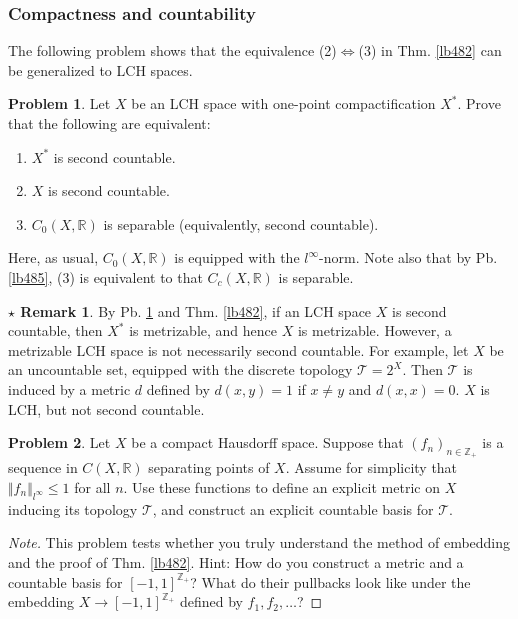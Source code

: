 \documentclass[12pt,b5paper,notitlepage]{article}
\theoremstyle{definition}
\newtheorem{srem}[df]{$\star$ Remark}
\newtheorem{prob}{\color{red}Problem}[section]
\theoremstyle{plain}
\newcommand{\mc}{\mathcal}
\newcommand{\Zbb}{\mathbb Z}
\newcommand{\Rbb}{\mathbb R}
\numberwithin{equation}{section}
\begin{document}
\subsubsection{Compactness and countability}


The following problem shows that the equivalence (2)$\Leftrightarrow$(3) in Thm. \ref{lb482} can be generalized to LCH spaces.

\begin{prob}\label{lb484}
Let $X$ be an LCH space with one-point compactification $X^*$. Prove that the following are equivalent:
\begin{enumerate}[label=(\arabic*)]
\item $X^*$ is second countable.
\item $X$ is second countable.
\item $C_0(X,\Rbb)$ is separable (equivalently, second countable).
\end{enumerate}
Here, as usual, $C_0(X,\Rbb)$ is equipped with the $l^\infty$-norm. Note also that by Pb. \ref{lb485}, (3) is equivalent to that $C_c(X,\Rbb)$ is separable.
\end{prob}


\begin{srem}
By Pb. \ref{lb484} and Thm. \ref{lb482}, if an LCH space $X$ is second countable, then $X^*$ is metrizable, and hence $X$ is metrizable. However, a metrizable LCH space is not necessarily second countable. For example, let $X$ be an uncountable set, equipped with the discrete topology $\mc T=2^X$. Then $\mc T$ is induced by a metric $d$ defined by $d(x,y)=1$ if $x\neq y$ and $d(x,x)=0$. $X$ is LCH, but not second countable.
\end{srem}


\begin{prob}\label{lb533}
Let $X$ be a compact Hausdorff space. Suppose that $(f_n)_{n\in\Zbb_+}$ is a sequence in $C(X,\Rbb)$ separating points of $X$. Assume for simplicity that $\Vert f_n\Vert_{l^\infty}\leq 1$ for all $n$. Use these functions to define an explicit metric on $X$ inducing its topology $\mc T$, and construct an explicit countable basis for $\mc T$. 
\end{prob}



\begin{proof}[Note]
This problem tests whether you truly understand the method of embedding and the proof of Thm. \ref{lb482}. Hint: How do you construct a metric and a countable basis for $[-1,1]^{\Zbb_+}$? What do their pullbacks look like under the embedding $X\rightarrow[-1,1]^{\Zbb_+}$ defined by $f_1,f_2,\dots$?
\end{proof}
\end{document}

